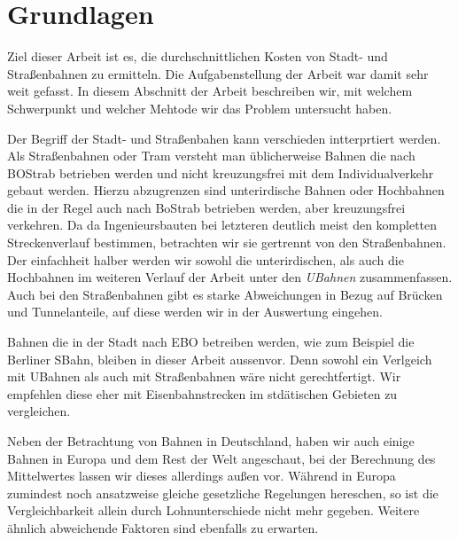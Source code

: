 \section{Grundlagen}

Ziel dieser Arbeit ist es, die durchschnittlichen Kosten von Stadt- und
Straßenbahnen zu ermitteln. Die Aufgabenstellung der Arbeit war damit sehr weit
gefasst. In diesem Abschnitt der Arbeit beschreiben wir, mit welchem Schwerpunkt
und welcher Mehtode wir das Problem untersucht haben.

Der Begriff der Stadt- und Straßenbahen kann verschieden intterprtiert
werden. Als Straßenbahnen oder Tram versteht man üblicherweise Bahnen die nach
BOStrab \cite{bostrab} betrieben werden und nicht kreuzungsfrei mit dem
Individualverkehr gebaut werden. Hierzu abzugrenzen sind unterirdische Bahnen
oder Hochbahnen die in der Regel auch nach BoStrab betrieben werden, aber
kreuzungsfrei verkehren. Da da Ingenieursbauten bei letzteren deutlich meist den
kompletten Streckenverlauf bestimmen, betrachten wir sie gertrennt von den
Straßenbahnen. Der einfachheit halber werden wir sowohl die unterirdischen, als
auch die Hochbahnen im weiteren Verlauf der Arbeit unter den \emph{UBahnen}
zusammenfassen. Auch bei den Straßenbahnen gibt es starke Abweichungen in Bezug
auf Brücken und Tunnelanteile, auf diese werden wir in der Auswertung eingehen.

Bahnen die in der Stadt nach EBO \cite{ebo} betreiben werden, wie zum Beispiel
die Berliner SBahn, bleiben in dieser Arbeit aussenvor. Denn sowohl ein
Verlgeich mit UBahnen als auch mit Straßenbahnen wäre nicht gerechtfertigt. Wir
empfehlen diese eher mit Eisenbahnstrecken im stdätischen Gebieten zu
vergleichen.

Neben der Betrachtung von Bahnen in Deutschland, haben wir auch einige Bahnen in
Europa und dem Rest der Welt angeschaut, bei der Berechnung des Mittelwertes
lassen wir dieses allerdings außen vor. Während in Europa zumindest noch
ansatzweise gleiche gesetzliche Regelungen hereschen, so ist die
Vergleichbarkeit allein durch Lohnunterschiede nicht mehr gegeben. Weitere
ähnlich abweichende Faktoren sind ebenfalls zu erwarten.

